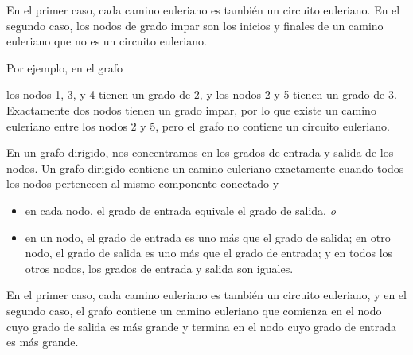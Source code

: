 En el primer caso, cada camino euleriano es también un circuito euleriano.
En el segundo caso, los nodos de grado impar son los inicios y finales
de un camino euleriano que no es un circuito euleriano.

Por ejemplo, en el grafo
\begin{center}
\end{center}
los nodos 1, 3, y 4 tienen un grado de 2, y los nodos 2 y 5 tienen un
grado de 3. Exactamente dos nodos tienen un grado impar, por lo que
existe un camino euleriano entre los nodos 2 y 5, pero el grafo no
contiene un circuito euleriano.

En un grafo dirigido, nos concentramos en los grados de entrada y salida
de los nodos. Un grafo dirigido contiene un camino euleriano exactamente
cuando todos los nodos pertenecen al mismo componente conectado y
\begin{itemize}
    \item en cada nodo, el grado de entrada equivale el grado de salida, \emph{o}
    \item en un nodo, el grado de entrada es uno más que el grado de salida;
          en otro nodo, el grado de salida es uno más que el grado de entrada;
          y en todos los otros nodos, los grados de entrada y salida son iguales.
\end{itemize}

En el primer caso, cada camino euleriano es también un circuito euleriano,
y en el segundo caso, el grafo contiene un camino euleriano que comienza
en el nodo cuyo grado de salida es más grande y termina en el nodo cuyo
grado de entrada es más grande.

